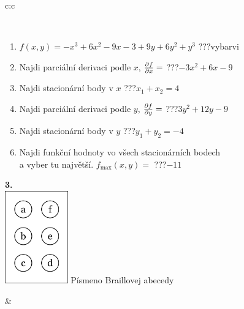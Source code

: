 \documentclass[10pt]{report}
\begin{document}
\begin{tabular}{c:c}
\begin{minipage}[c][104.5mm][t]{0.5\linewidth}
\begin{center}
\begin{minipage}{0.95\linewidth}
\begin{center}
\end{center}
\end{minipage}
\\[1mm]
\begin{minipage}{0.79\linewidth}
\begin{center}
\begin{varwidth}{\linewidth}
\begin{enumerate}
\normalsize
\item $f(x,y)=-x^3+6x^2-9x-3+9y+6y^2+y^3$\quad \dotfill\; ???\;\dotfill \quad vybarvi
\item Najdi parciální derivaci podle $x$, $\pdv{f}{x}=$\quad \dotfill\; ???\;\dotfill \quad $-3x^2+6x-9$
\item Najdi stacionární body v $x$\quad \dotfill\; ???\;\dotfill \quad $x_1+x_2=4$
\item Najdi parciální derivaci podle $y$, $\pdv{f}{y}=$\quad \dotfill\; ???\;\dotfill \quad $3y^2+12y-9$
\item Najdi stacionární body v $y$\quad \dotfill\; ???\;\dotfill \quad $y_1+y_2=-4$
\item Najdi funkční hodnoty vo všech stacionárních bodech \\ \phantom{xxxxxx} a vyber tu najvětší. $f_{\text{max}}(x,y)=$\quad \dotfill\; ???\;\dotfill \quad $-11$
\end{enumerate}
\end{varwidth}
\end{center}
\end{minipage}
\begin{minipage}{0.20\linewidth}
\begin{center}
{\Huge\bfseries 3.} \\[2mm]
\includegraphics[height=40mm]{../images/braille.png}
{\small Písmeno Braillovej abecedy}
\end{center}
\end{minipage}
\end{center}
\end{minipage}
&
\begin{minipage}[c][104.5mm][t]{0.5\linewidth}
\begin{center}

\end{center}
\end{minipage}
\end{tabular}
\end{document}
